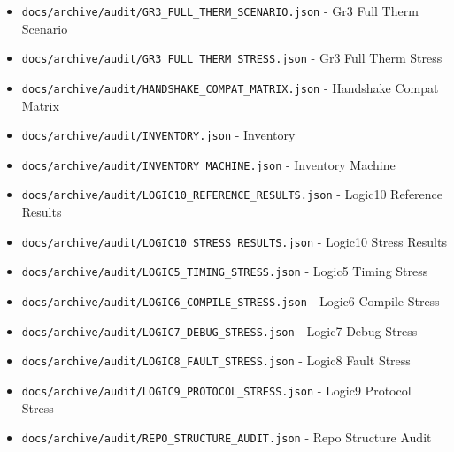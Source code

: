\documentclass[10.5pt,a4paper,openany]{book}
\begin{document}
\begin{itemize}
\item \texttt{docs/\allowbreak{}archive/\allowbreak{}audit/\allowbreak{}GR3\_\allowbreak{}FULL\_\allowbreak{}THERM\_\allowbreak{}SCENARIO.\allowbreak{}json} -\allowbreak{} Gr3 Full Therm Scenario
\item \texttt{docs/\allowbreak{}archive/\allowbreak{}audit/\allowbreak{}GR3\_\allowbreak{}FULL\_\allowbreak{}THERM\_\allowbreak{}STRESS.\allowbreak{}json} -\allowbreak{} Gr3 Full Therm Stress
\item \texttt{docs/\allowbreak{}archive/\allowbreak{}audit/\allowbreak{}HANDSHAKE\_\allowbreak{}COMPAT\_\allowbreak{}MATRIX.\allowbreak{}json} -\allowbreak{} Handshake Compat Matrix
\item \texttt{docs/\allowbreak{}archive/\allowbreak{}audit/\allowbreak{}INVENTORY.\allowbreak{}json} -\allowbreak{} Inventory
\item \texttt{docs/\allowbreak{}archive/\allowbreak{}audit/\allowbreak{}INVENTORY\_\allowbreak{}MACHINE.\allowbreak{}json} -\allowbreak{} Inventory Machine
\item \texttt{docs/\allowbreak{}archive/\allowbreak{}audit/\allowbreak{}LOGIC10\_\allowbreak{}REFERENCE\_\allowbreak{}RESULTS.\allowbreak{}json} -\allowbreak{} Logic10 Reference Results
\item \texttt{docs/\allowbreak{}archive/\allowbreak{}audit/\allowbreak{}LOGIC10\_\allowbreak{}STRESS\_\allowbreak{}RESULTS.\allowbreak{}json} -\allowbreak{} Logic10 Stress Results
\item \texttt{docs/\allowbreak{}archive/\allowbreak{}audit/\allowbreak{}LOGIC5\_\allowbreak{}TIMING\_\allowbreak{}STRESS.\allowbreak{}json} -\allowbreak{} Logic5 Timing Stress
\item \texttt{docs/\allowbreak{}archive/\allowbreak{}audit/\allowbreak{}LOGIC6\_\allowbreak{}COMPILE\_\allowbreak{}STRESS.\allowbreak{}json} -\allowbreak{} Logic6 Compile Stress
\item \texttt{docs/\allowbreak{}archive/\allowbreak{}audit/\allowbreak{}LOGIC7\_\allowbreak{}DEBUG\_\allowbreak{}STRESS.\allowbreak{}json} -\allowbreak{} Logic7 Debug Stress
\item \texttt{docs/\allowbreak{}archive/\allowbreak{}audit/\allowbreak{}LOGIC8\_\allowbreak{}FAULT\_\allowbreak{}STRESS.\allowbreak{}json} -\allowbreak{} Logic8 Fault Stress
\item \texttt{docs/\allowbreak{}archive/\allowbreak{}audit/\allowbreak{}LOGIC9\_\allowbreak{}PROTOCOL\_\allowbreak{}STRESS.\allowbreak{}json} -\allowbreak{} Logic9 Protocol Stress
\item \texttt{docs/\allowbreak{}archive/\allowbreak{}audit/\allowbreak{}REPO\_\allowbreak{}STRUCTURE\_\allowbreak{}AUDIT.\allowbreak{}json} -\allowbreak{} Repo Structure Audit

\end{itemize}
\end{document}
